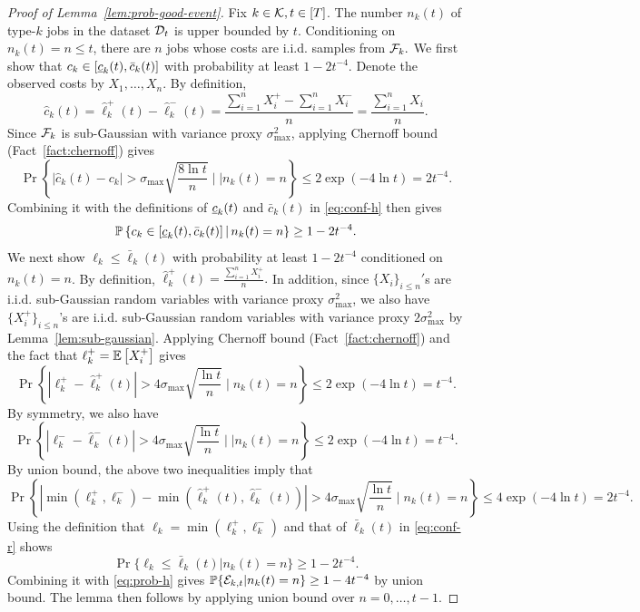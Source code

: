 \begin{proof}[Proof of Lemma~\ref{lem:prob-good-event}]
Fix $k \in \mathcal{K}, t \in [T]$. The number $n_k(t)$ of type-$k$ jobs in the dataset $\mathcal{D}_t$ is upper bounded by $t$. Conditioning on $n_k(t) = n \leq t$, there are $n$ jobs whose costs are i.i.d. samples from $\mathcal{F}_k.$ We first show that $c_k \in [\underline{c}_k(t),\bar{c}_k(t)]$ with probability at least $1 - 2t^{-4}.$ Denote the observed costs by $X_1,\ldots,X_n.$ By definition, 
\[
\hat{c}_k(t) = \hat{\ell}_k^+(t) - \hat{\ell}_k^-(t)  = \frac{\sum_{i=1}^n X_i^+ - \sum_{i=1}^n X_i^-}{n} = \frac{\sum_{i=1}^n X_i}{n}.
\]
Since $\mathcal{F}_k$ is sub-Gaussian with variance proxy $\sigma_{\max}^2$, applying Chernoff bound (Fact~\ref{fact:chernoff}) gives
\[
\Pr\left\{|\hat{c}_k(t) - c_k| > \sigma_{\max}\sqrt{\frac{8\ln t}{n}} \mid| n_k(t) = n \right \} \leq 2\exp\left(-4\ln t\right) = 2t^{-4}.
\]
Combining it with the definitions of $\underline{c}_k(t)$ and $\bar{c}_k(t)$ in \eqref{eq:conf-h} then gives 
\begin{equation}\label{eq:prob-h}
\mathbb{P}\left\{c_k \in [\underline{c}_k(t),\bar{c}_k(t)] \,\middle\vert\, n_k(t) = n  \right \} \geq 1 - 2t^{-4}.
\end{equation}
We next show $\ell_k \leq \bar{\ell}_k(t)$ with probability at least $1-2t^{-4}$ conditioned on $n_k(t) = n$. By definition, $\hat{\ell}_k^+(t) = \frac{\sum_{i=1}^n X_i^+}{n}.$ In addition, since $\{X_i\}_{i \leq n}'$s are i.i.d. sub-Gaussian random variables with variance proxy $\sigma^2_{\max}$, we also have $\{X_i^+\}_{i \leq n}$'s are i.i.d. sub-Gaussian random variables with variance proxy $2\sigma^2_{\max}$ by Lemma~\ref{lem:sub-gaussian}. Applying Chernoff bound (Fact~\ref{fact:chernoff}) and the fact that $\ell_k^+ = \mathbb E\left[X_i^+\right]$ gives
\[
\Pr\left\{|\ell_k^+ - \hat{\ell}_k^+(t)| > 4\sigma_{\max}\sqrt{\frac{\ln t}{n}} \mid n_k(t) = n \right \} \leq 2\exp\left(-4\ln t\right) = t^{-4}.
\]
By symmetry, we also have 
\[
\Pr\left\{|\ell_k^- - \hat{\ell}_k^-(t)| > 4\sigma_{\max}\sqrt{\frac{\ln t}{n}} \mid| n_k(t) = n \right \} \leq 2\exp\left(-4\ln t\right) = t^{-4}.
\]
By union bound, the above two inequalities imply that 
\[
\Pr\left\{\left|\min(\ell_k^+,\ell_k^-) - \min(\hat{\ell}_k^+(t),\hat{\ell}_k^-(t))\right| > 4\sigma_{\max}\sqrt{\frac{\ln t}{n}} \mid n_k(t) = n \right \} \leq 4\exp\left(-4\ln t\right) = 2t^{-4}.
\]
Using the definition that $\ell_k = \min(\ell_k^+,\ell_k^-)$ and that of $\bar{\ell}_k(t)$ in \eqref{eq:conf-r} shows \[\Pr\{\ell_k \leq \bar{\ell}_k(t) | n_k(t) = n \} \geq 1 - 2t^{-4}.\] Combining it with \eqref{eq:prob-h} gives $\mathbb{P}\{\mathcal{E}_{k,t} | n_k(t) = n\} \geq 1 - 4t^{-4}$ by union bound. The lemma then follows by applying union bound over $n = 0,\ldots,t-1.$
\end{proof}

